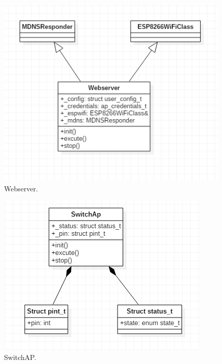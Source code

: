 \documentclass[a4paper,12pt,oneside]{article}
\begin{document}
\begin{itemize}
\begin{itemize}
\begin{figure}[H]
\centering
\begin{center}
\includegraphics[scale=.85]{hinh/class_webserver.PNG}
\end{center}
\caption{ Webserver.}
\end{figure}

\begin{figure}[H]
\centering
\begin{center}
\includegraphics[scale=.85]{hinh/class_switchap.PNG}
\end{center}
\caption{SwitchAP.}
\end{figure}


\end{itemize}
\end{itemize}
\end{document}
